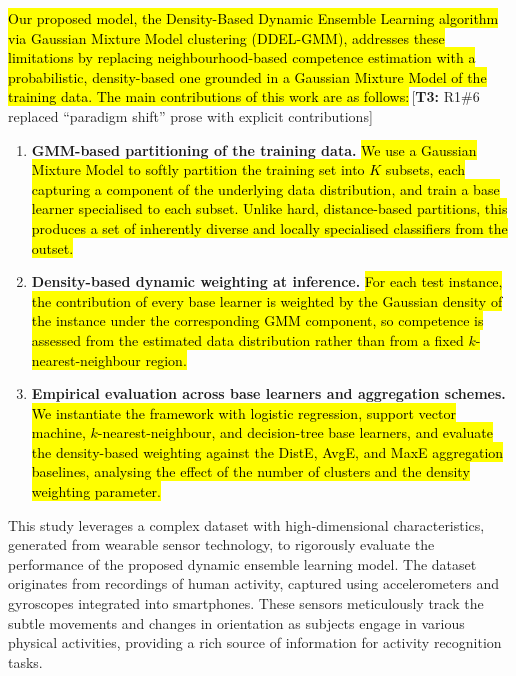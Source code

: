 \documentclass[lettersize,journal]{IEEEtran}
\newcommand{\tchange}[2]{\hl{#1}\,\textcolor{tier3note}{\footnotesize[\textbf{T3:} #2]}}
\newcommand{\hlonly}[1]{\hl{#1}}
\begin{document}
	\tchange{Our proposed model, the Density-Based Dynamic Ensemble Learning algorithm via Gaussian Mixture Model clustering (DDEL-GMM), addresses these limitations by replacing neighbourhood-based competence estimation with a probabilistic, density-based one grounded in a Gaussian Mixture Model of the training data. The main contributions of this work are as follows:}{R1\#6 replaced ``paradigm shift'' prose with explicit contributions}
	\begin{enumerate}
		\item \textbf{GMM-based partitioning of the training data.} \hlonly{We use a Gaussian Mixture Model to softly partition the training set into \mbox{$K$} subsets, each capturing a component of the underlying data distribution, and train a base learner specialised to each subset. Unlike hard, distance-based partitions, this produces a set of inherently diverse and locally specialised classifiers from the outset.}
		\item \textbf{Density-based dynamic weighting at inference.} \hlonly{For each test instance, the contribution of every base learner is weighted by the Gaussian density of the instance under the corresponding GMM component, so competence is assessed from the estimated data distribution rather than from a fixed \mbox{$k$}-nearest-neighbour region.}
		\item \textbf{Empirical evaluation across base learners and aggregation schemes.} \hlonly{We instantiate the framework with logistic regression, support vector machine, \mbox{$k$}-nearest-neighbour, and decision-tree base learners, and evaluate the density-based weighting against the DistE, AvgE, and MaxE aggregation baselines, analysing the effect of the number of clusters and the density weighting parameter.}
	\end{enumerate}
	
	This study leverages a complex dataset with high-dimensional characteristics, generated from wearable sensor technology, to rigorously evaluate the performance of the proposed dynamic ensemble learning model. The dataset originates from recordings of human activity, captured using accelerometers and gyroscopes integrated into smartphones. These sensors meticulously track the subtle movements and changes in orientation as subjects engage in various physical activities, providing a rich source of information for activity recognition tasks.
	
\end{document}

